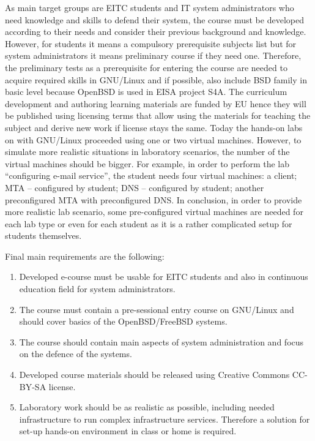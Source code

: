 As main target groups are \gls{EITC} students and IT system administrators who need knowledge and skills to defend their system, the course must be developed according to their needs and consider their previous background and knowledge. However, for students it means a compulsory prerequisite subjects list but for system administrators it means preliminary course if they need one. Therefore, the preliminary tests as  a prerequisite for entering the course are needed to acquire required skills in GNU/Linux and if possible, also include \gls{BSD} family in basic level because OpenBSD is used in \gls{EISA} project S4A.
The curriculum development and authoring learning materials are funded by EU hence they  will be published using licensing terms that allow using the materials for teaching the subject and derive new work if license stays the same.  Today the hands-on labs on with GNU/Linux proceeded using one or two virtual machines. However,  to simulate more realistic situations in laboratory scenarios,  the number of the virtual machines should be bigger.  For example, in order to perform the lab “configuring e-mail service”, the student needs four virtual machines: a client;  \gls{MTA} -- configured by student; \gls{DNS} -- configured by student; another preconfigured \gls{MTA} with preconfigured \gls{DNS}. In conclusion, in order to provide more realistic lab scenario, some pre-configured virtual machines are needed for each lab type or even for each student as it is a rather complicated setup for students themselves.
 
Final main requirements are the following:
\begin{enumerate}[label=Requirement \arabic*.,leftmargin=*]
  \item Developed e-course must be usable for \gls{EITC} students and also in continuous education field for system administrators.
  \item The course must contain a pre-sessional entry course on GNU/Linux and should cover basics  of the OpenBSD/FreeBSD systems.
  \item The course should contain main aspects of system administration and focus on the defence of the systems.
  \item Developed course materials should be released using Creative Commons \gls{CC-BY-SA} license.
  \item Laboratory work should be as realistic as possible, including needed infrastructure to run complex infrastructure services. Therefore a solution for set-up hands-on environment in class or home is required.
\end{enumerate}


